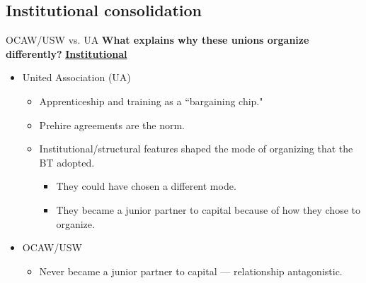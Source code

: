 \documentclass{beamer}
\begin{document}
\subsection*{Institutional consolidation}
\begin{frame}{OCAW/USW vs. UA}
\textbf{What explains why these unions organize differently?}\newline\newline
\underline{\textbf{Institutional}}
	\begin{itemize}
		\item United Association (UA)
			\begin{itemize}
				\item Apprenticeship and training as a ``bargaining chip."
				\item Prehire agreements are the norm.
				\item Institutional/structural features shaped the mode of organizing that the BT adopted.
				\begin{itemize}
					\item They could have chosen a different mode.
					\item They became a junior partner to capital because of how they chose to organize.
				\end{itemize}
	\end{itemize}
		\item OCAW/USW
		\begin{itemize}
			\item Never became a junior partner to capital — relationship antagonistic.
		\end{itemize}
	\end{itemize}
\end{frame}
\end{document}
